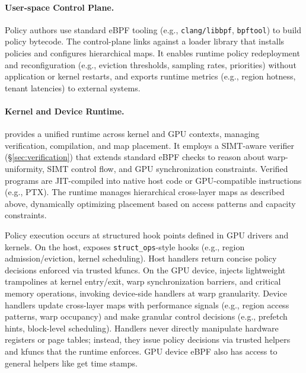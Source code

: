 \paragraph{User-space Control Plane.}
Policy authors use standard eBPF tooling (e.g., \texttt{clang/libbpf}, \texttt{bpftool}) to build policy bytecode. The control-plane links against a loader library that installs policies and configures hierarchical maps. It enables runtime policy redeployment and reconfiguration (e.g., eviction thresholds, sampling rates, priorities) without application or kernel restarts, and exports runtime metrics (e.g., region hotness, tenant latencies) to external systems.

\paragraph{Kernel and Device Runtime.}
\sys provides a unified runtime across kernel and GPU contexts, managing verification, compilation, and map placement. It employs a SIMT-aware verifier (\S\ref{sec:verification}) that extends standard eBPF checks to reason about warp-uniformity, SIMT control flow, and GPU synchronization constraints. Verified programs are JIT-compiled into native host code or GPU-compatible instructions (e.g., PTX). The runtime manages hierarchical cross-layer maps as described above, dynamically optimizing placement based on access patterns and capacity constraints.

Policy execution occurs at structured hook points defined in GPU drivers and kernels. On the host, \sysdriver exposes \texttt{struct\_ops}-style hooks (e.g., region admission/eviction, kernel scheduling). Host handlers return concise policy decisions enforced via trusted kfuncs. On the GPU device, \sys injects lightweight trampolines at kernel entry/exit, warp synchronization barriers, and critical memory operations, invoking device-side handlers at warp granularity. Device handlers update cross-layer maps with performance signals (e.g., region access patterns, warp occupancy) and make granular control decisions (e.g., prefetch hints, block-level scheduling). Handlers never directly manipulate hardware registers or page tables; instead, they issue policy decisions via trusted helpers and kfuncs that the runtime enforces. GPU device eBPF also has access to general helpers like get time stamps.


